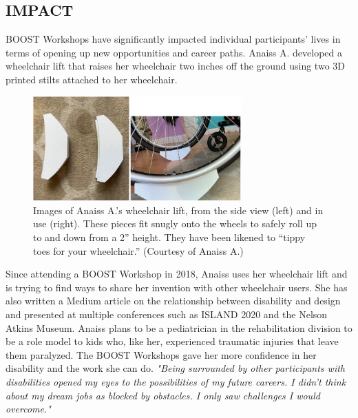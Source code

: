\documentclass[11.5pt]{sig-alternate} %
\begin{document}
\begin{large}
\section*{IMPACT}

BOOST Workshops have significantly impacted individual participants' lives in terms of opening up new opportunities and career paths. Anaiss A. developed a wheelchair lift that raises her wheelchair two inches off the ground using two 3D printed stilts attached to her wheelchair. 
\begin{figure}[h]
    \centering
    \includegraphics[width=8cm]{figure5.png}
    \caption{Images of Anaiss A.’s wheelchair lift, from the side view (left) and in use (right). These pieces fit snugly onto the wheels to safely roll up to and down from a 2” height. They have been likened to “tippy toes for your wheelchair.” (Courtesy of Anaiss A.) }
\end{figure}
Since attending a BOOST Workshop in 2018, Anaiss uses her wheelchair lift and is trying to find ways to share her invention with other wheelchair users. She has also written a Medium article on the relationship between disability and design and presented at multiple conferences such as ISLAND 2020 and the Nelson Atkins Museum. Anaiss plans to be a pediatrician in the rehabilitation division to be a role model to kids who, like her, experienced traumatic injuries that leave them paralyzed. The BOOST Workshops gave her more confidence in her disability and the work she can do. \textit{"Being surrounded by other participants with disabilities opened my eyes to the possibilities of my future careers. I didn't think about my dream jobs as blocked by obstacles. I only saw challenges I would overcome."}


\end{large}
\end{document}

